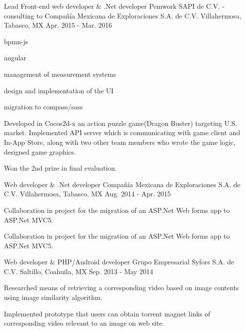 \begin{cventries}
\cventry
{Lead Front-end web developer \& .Net developer} %
{Pemwork SAPI de C.V. - consulting to Compañía Mexicana de Exploraciones S.A. de C.V.} %
{Villahermosa, Tabasco, MX} %
{Apr. 2015 - Mar. 2016} %
{ %
\begin{cvitems}
	\item{bpmn-js}
	\item{angular}
	\item{management of measurement systems}
	\item{design and implementation of the UI}
	\item{migration to compass/sass}
\item {Developed in Cocos2d-x an action puzzle game(Dragon Buster) targeting U.S. market. Implemented API server which is communicating with game client and In-App Store, along with two other team members who wrote the game logic, designed game graphics.}
\item {Won the 2nd prize in final evaluation.}
\end{cvitems}
}


\cventry
{Web developer \& .Net developer} %
{Compañía Mexicana de Exploraciones S.A. de C.V.} %
{Villahermosa, Tabasco, MX} %
{Aug. 2014 - Apr. 2015} %
{ %
	\begin{cvitems}
		\item {Collaboration in project for the migration of an ASP.Net Web forms app to ASP.Net MVC5.}
		\item {Collaboration in project for the migration of an ASP.Net Web forms app to ASP.Net MVC5.}
	\end{cvitems}
}


\cventry
{Web developer \& PHP/Android developer} %
{Grupo Empresarial Syfors S.A. de C.V.} %
{Saltillo, Coahuila, MX} %
{Sep. 2013 - May 2014} %
{ %
	\begin{cvitems}
	\item {Researched means of retrieving a corresponding video based on image contents using image similarity algorithm.}
	\item {Implemented prototype that users can obtain torrent magnet links of corresponding video relevant to an image on web site.}
	\end{cvitems} 
}


\end{cventries}
